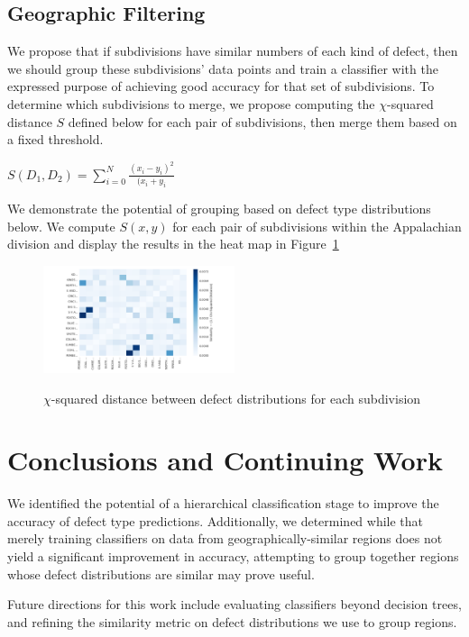 \documentclass{sig-alternate-05-2015}
\begin{document}
\subsection{Geographic Filtering}
We propose that if subdivisions have similar numbers of each kind of defect, then we should
group these subdivisions' data points and train a classifier with the expressed purpose of 
achieving good accuracy for that set of subdivisions. To determine which subdivisions to merge,
we propose computing the $\chi$-squared distance $S$ defined below for each pair of 
subdivisions, then merge them based on a fixed threshold. 
\begin{center}
    $S(D_1,D_2) = \sum\limits_{i=0}^{N}\frac{(x_i - y_i)^2}{(x_i + y_i}$
\end{center}
We demonstrate the potential of grouping based on defect type distributions below. We compute
$S(x,y)$ for each pair of subdivisions within the Appalachian division and display the results
in the heat map in Figure~\ref{similarity_heatmap}
\begin{figure}[ht!]
\includegraphics[width=0.5\textwidth]{similarity_heatmap.pdf}
\label{similarity_heatmap}
\caption{$\chi$-squared distance between defect distributions for each subdivision}
\end{figure}

\section{Conclusions and Continuing Work}
We identified the potential of a hierarchical classification stage to improve the accuracy of 
defect type predictions. Additionally, we determined while that merely training classifiers on 
data from geographically-similar regions does not yield a significant improvement in accuracy, 
attempting to group together regions whose defect distributions are similar may prove useful. 

Future directions for this work include evaluating classifiers beyond decision trees, and 
refining the similarity metric on defect distributions we use to group regions.




  
\end{document}
